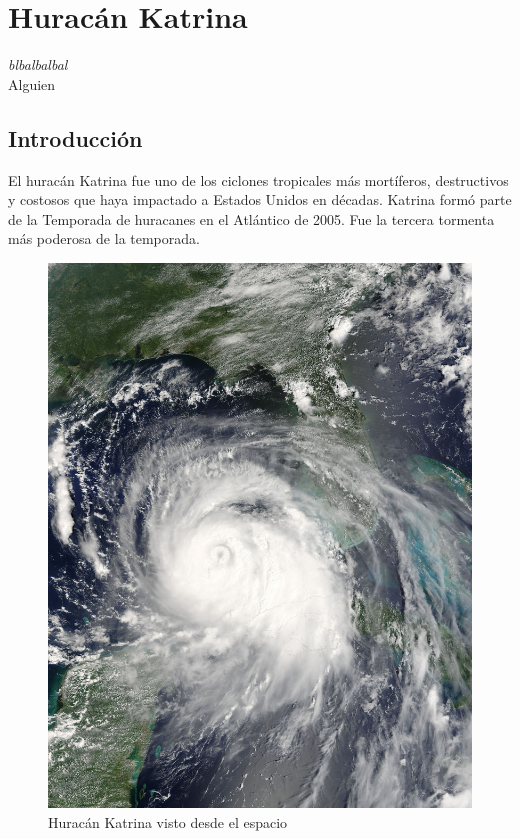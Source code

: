 \chapter*{Huracán Katrina} \label{cap0b}


\begin{flushright}
\begin{minipage}{7.85cm}
    {\em blbalbalbal} \\ Alguien %
\end{minipage}
\end{flushright}

\vspace*{5mm}

\section*{Introducción}

El huracán Katrina fue uno de los ciclones tropicales más mortíferos,
destructivos y costosos que haya impactado a Estados Unidos en décadas. Katrina
formó parte de la Temporada de huracanes en el Atlántico de 2005. Fue la tercera
tormenta más poderosa de la temporada.

\begin{figure}[H]
 \centering
 \includegraphics[width=120mm]{figuras/cap0/hurricane.png}
 \caption{Huracán Katrina visto desde el espacio}
\end{figure}

